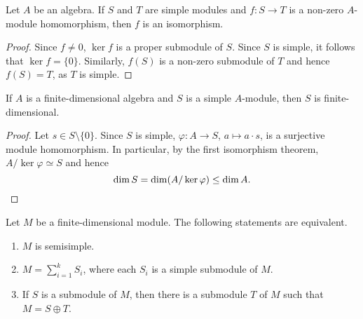 
\begin{lemma}[Schur]
	Let $A$ be an algebra. If $S$ and $T$ are
	simple modules and $f\colon S\to T$ is a non-zero $A$-module homomorphism, 
	then $f$ is an isomorphism. 
\end{lemma}

\begin{proof}
Since $f\ne 0$, $\ker f$ is a proper submodule of $S$. Since $S$ is simple, it follows 
that $\ker f=\{0\}$. Similarly, $f(S)$ 
is a non-zero submodule of $T$ and hence $f(S)=T$, as $T$ is simple. 	
\end{proof}

\begin{proposition}
    If $A$ is a finite-dimensional algebra and $S$ is a simple $A$-module, then $S$ is finite-dimensional. 
\end{proposition}

\begin{proof}
    Let $s\in S\setminus\{0\}$. Since $S$ is simple, $\varphi\colon A\to S$, $a\mapsto a\cdot s$, is a surjective 
    module homomorphism. 
    In particular, by the first isomorphism theorem, 
    $A/\ker\varphi\simeq S$ and hence 
    \[
    \dim S=\dim (A/\ker\varphi)\leq \dim A.\qedhere
    \]
\end{proof}

\begin{proposition}
\label{pro:semisimple}
	Let $M$ be a finite-dimensional module. The following statements are equivalent.
	\begin{enumerate}
		\item $M$ is semisimple.
		\item $M=\sum_{i=1}^k S_i$, where each $S_i$ is a simple submodule of $M$. 
		\item If $S$ is a submodule of $M$, then there is a submodule $T$ of $M$ such that $M=S\oplus T$.    
	\end{enumerate}
\end{proposition}

